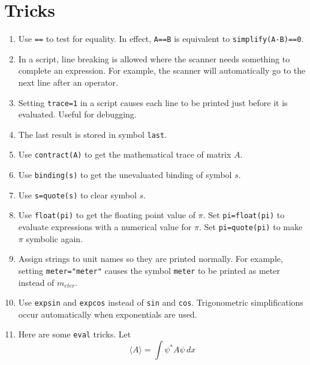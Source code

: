 

\section*{Tricks}

\begin{enumerate}

\item
Use \verb$==$ to test for equality.
In effect, \verb$A==B$ is equivalent to \verb$simplify(A-B)==0$.

\item
In a script, line breaking is allowed where the scanner needs something to complete an expression.
For example, the scanner will automatically go to the next line after an operator.

\item
Setting \verb$trace=1$ in a script causes each line to be printed just before it is evaluated.
Useful for debugging.

\item
The last result is stored in symbol \verb$last$.

\item
Use \verb$contract(A)$ to get the mathematical trace of matrix $A$.

\item
Use \verb$binding(s)$ to get the unevaluated binding of symbol $s$.

\item
Use \verb$s=quote(s)$ to clear symbol $s$.

\item
Use \verb$float(pi)$ to get the floating point value of $\pi$.
Set \verb$pi=float(pi)$ to evaluate expressions with a numerical value for $\pi$.
Set \verb$pi=quote(pi)$ to make $\pi$ symbolic again.

\item
Assign strings to unit names so they are printed normally.
For example, setting \verb$meter="meter"$ causes the symbol \verb$meter$
to be printed as meter instead of $m_{eter}$.

\item
Use \verb$expsin$ and \verb$expcos$ instead of \verb$sin$ and \verb$cos$.
Trigonometric simplifications occur automatically when exponentials are used.

\item
Here are some \verb$eval$ tricks. Let
\begin{equation*}
\langle A\rangle=\int\psi^*A\psi\,dx
\end{equation*}


\end{enumerate}
